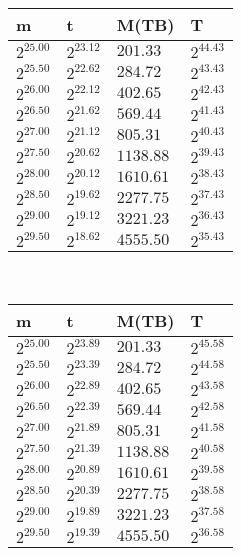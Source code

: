 \begin{tabular}{llll}
m & t & M(TB) & T \\ \hline
$2^{25.00}$ & $2^{23.12}$ & $201.33$ & $2^{44.43}$ \\
$2^{25.50}$ & $2^{22.62}$ & $284.72$ & $2^{43.43}$ \\
$2^{26.00}$ & $2^{22.12}$ & $402.65$ & $2^{42.43}$ \\
$2^{26.50}$ & $2^{21.62}$ & $569.44$ & $2^{41.43}$ \\
$2^{27.00}$ & $2^{21.12}$ & $805.31$ & $2^{40.43}$ \\
$2^{27.50}$ & $2^{20.62}$ & $1138.88$ & $2^{39.43}$ \\
$2^{28.00}$ & $2^{20.12}$ & $1610.61$ & $2^{38.43}$ \\
$2^{28.50}$ & $2^{19.62}$ & $2277.75$ & $2^{37.43}$ \\
$2^{29.00}$ & $2^{19.12}$ & $3221.23$ & $2^{36.43}$ \\
$2^{29.50}$ & $2^{18.62}$ & $4555.50$ & $2^{35.43}$ \\
\end{tabular}
 \ 
\begin{tabular}{llll}
m & t & M(TB) & T \\ \hline
$2^{25.00}$ & $2^{23.89}$ & $201.33$ & $2^{45.58}$ \\
$2^{25.50}$ & $2^{23.39}$ & $284.72$ & $2^{44.58}$ \\
$2^{26.00}$ & $2^{22.89}$ & $402.65$ & $2^{43.58}$ \\
$2^{26.50}$ & $2^{22.39}$ & $569.44$ & $2^{42.58}$ \\
$2^{27.00}$ & $2^{21.89}$ & $805.31$ & $2^{41.58}$ \\
$2^{27.50}$ & $2^{21.39}$ & $1138.88$ & $2^{40.58}$ \\
$2^{28.00}$ & $2^{20.89}$ & $1610.61$ & $2^{39.58}$ \\
$2^{28.50}$ & $2^{20.39}$ & $2277.75$ & $2^{38.58}$ \\
$2^{29.00}$ & $2^{19.89}$ & $3221.23$ & $2^{37.58}$ \\
$2^{29.50}$ & $2^{19.39}$ & $4555.50$ & $2^{36.58}$ \\
\end{tabular}
 \ 
